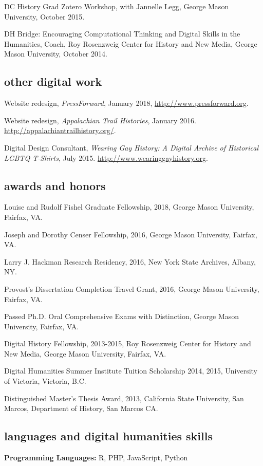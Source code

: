 \documentclass[11pt]{article}
\begin{document}
DC History Grad Zotero Workshop, with Jannelle Legg, George Mason University, October 2015.

DH Bridge: Encouraging Computational Thinking and Digital Skills in the Humanities, Coach, Roy Rosenzweig Center for History and New Media, George Mason University, October 2014.

\subsection{other digital work}\label{other-digital-work}

Website redesign, \emph{PressForward}, January 2018, \url{http://www.pressforward.org}.

Website redesign, \emph{Appalachian Trail Histories}, January 2016. \url{http://appalachiantrailhistory.org/}.

Digital Design Consultant, \emph{Wearing Gay History: A Digital Archive of Historical LGBTQ T-Shirts}, July 2015. \url{http://www.wearinggayhistory.org}.

\subsection{awards and honors}
Louise and Rudolf Fishel Graduate Fellowship, 2018, George Mason University, Fairfax, VA.

Joseph and Dorothy Censer Fellowship, 2016, George Mason University, Fairfax, VA.

Larry J. Hackman Research Residency, 2016, New York State Archives, Albany, NY.

Provost's Dissertation Completion Travel Grant, 2016, George Mason University, Fairfax, VA.

Passed Ph.D. Oral Comprehensive Exams with Distinction, George Mason University, Fairfax, VA.

Digital History Fellowship, 2013-2015, Roy Rosenzweig Center for History and New Media, George Mason University, Fairfax, VA.

Digital Humanities Summer Institute Tuition Scholarship 2014, 2015, University of Victoria, Victoria, B.C.

Distinguished Master's Thesis Award, 2013, California State University, San Marcos, Department of History, San Marcos CA.


\subsection{languages and digital humanities skills}
\textbf{Programming Languages:} R, PHP, JavaScript, Python
\end{document}
